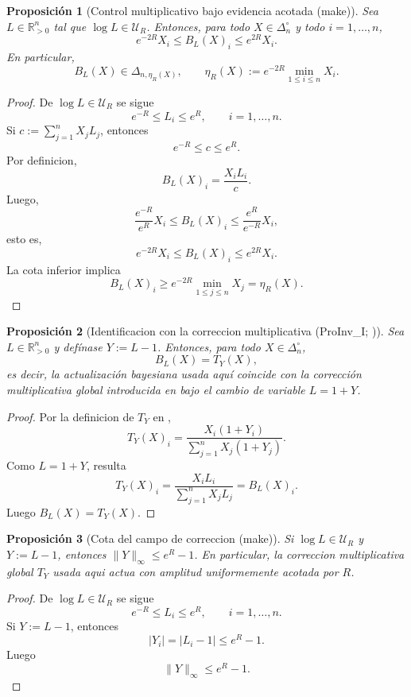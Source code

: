 ﻿\documentclass[12pt]{article}
\newcommand{\fuente}[1]{\textnormal{(#1)}}
\newcommand{\fuentecite}[2]{\textnormal{(#1; \citealp{#2})}}
\newtheorem{proposicion}{Proposición}[section]
\begin{document}
\begin{proposicion}[Control multiplicativo bajo evidencia acotada \fuente{make}]
Sea \(L\in\mathbb R_{>0}^n\) tal que \(\log L\in\mathcal U_R\). Entonces, para todo \(X\in\Delta_n^\circ\) y todo \(i=1,\dots,n\),
\[
e^{-2R}X_i\le B_L(X)_i\le e^{2R}X_i.
\]
En particular,
\[
B_L(X)\in \Delta_{n,\eta_R(X)},
\qquad
\eta_R(X):=e^{-2R}\min_{1\le i\le n}X_i.
\]
\end{proposicion}
\begin{proof}
De \(\log L\in\mathcal U_R\) se sigue
\[
e^{-R}\le L_i\le e^R,\qquad i=1,\dots,n.
\]
Si \(c:=\sum_{j=1}^n X_jL_j\), entonces
\[
e^{-R}\le c\le e^R.
\]
Por definicion,
\[
B_L(X)_i=\frac{X_iL_i}{c}.
\]
Luego,
\[
\frac{e^{-R}}{e^R}X_i\le B_L(X)_i\le \frac{e^R}{e^{-R}}X_i,
\]
esto es,
\[
e^{-2R}X_i\le B_L(X)_i\le e^{2R}X_i.
\]
La cota inferior implica
\[
B_L(X)_i\ge e^{-2R}\min_{1\le j\le n}X_j=\eta_R(X).
\]
\end{proof}

\begin{proposicion}[Identificacion con la correccion multiplicativa \fuentecite{ProInv\_I}{ControlInformacional2026}]
Sea \(L\in\mathbb R_{>0}^n\) y defínase \(Y:=L-1\). Entonces, para todo \(X\in\Delta_n^\circ\),
\[
B_L(X)=T_Y(X),
\]
es decir, la actualización bayesiana usada aquí coincide con la corrección multiplicativa global introducida en \cite{ControlInformacional2026} bajo el cambio de variable \(L=1+Y\).
\end{proposicion}
\begin{proof}
Por la definicion de \(T_Y\) en \cite{ControlInformacional2026},
\[
T_Y(X)_i=\frac{X_i(1+Y_i)}{\sum_{j=1}^n X_j(1+Y_j)}.
\]
Como \(L=1+Y\), resulta
\[
T_Y(X)_i=\frac{X_iL_i}{\sum_{j=1}^n X_jL_j}=B_L(X)_i.
\]
Luego \(B_L(X)=T_Y(X)\).
\end{proof}

\begin{proposicion}[Cota del campo de correccion \fuente{make}]
Si \(\log L\in\mathcal U_R\) y \(Y:=L-1\), entonces \(\|Y\|_\infty\le e^R-1\). En particular, la correccion multiplicativa global \(T_Y\) usada aqui actua con amplitud uniformemente acotada por \(R\).
\end{proposicion}
\begin{proof}
De \(\log L\in\mathcal U_R\) se sigue
\[
e^{-R}\le L_i\le e^R,
\qquad i=1,\dots,n.
\]
Si \(Y:=L-1\), entonces
\[
|Y_i|=|L_i-1|\le e^R-1.
\]
Luego
\[
\|Y\|_\infty\le e^R-1.
\]
\end{proof}
\end{document}
